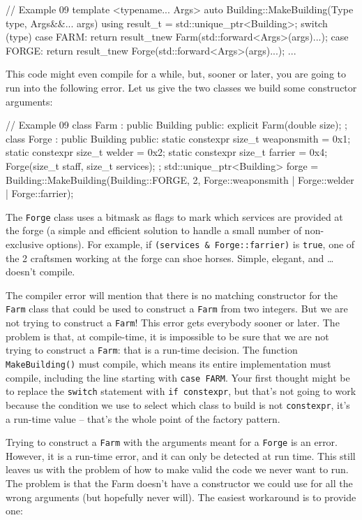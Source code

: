 \begin{code}
// Example 09
template <typename... Args>
auto Building::MakeBuilding(Type type, Args&&... args) {
  using result_t = std::unique_ptr<Building>;
  switch (type) {
    case FARM: return
      result_t{new Farm(std::forward<Args>(args)...)};
    case FORGE: return
      result_t{new Forge(std::forward<Args>(args)...)};
    ...
  }
}
\end{code}

This code might even compile for a while, but, sooner or later, you are going to run into the following error. Let us give the two classes we build some constructor arguments:

\begin{code}
// Example 09
class Farm : public Building {
  public:
  explicit Farm(double size);
};
class Forge : public Building {
  public:
  static constexpr size_t weaponsmith = 0x1;
  static constexpr size_t welder = 0x2;
  static constexpr size_t farrier = 0x4;
  Forge(size_t staff, size_t services);
};
std::unique_ptr<Building> forge =
  Building::MakeBuilding(Building::FORGE, 2,
    Forge::weaponsmith | Forge::welder | Forge::farrier);
\end{code}

The \texttt{Forge} class uses a bitmask as flags to mark which services are provided at the forge (a simple and efficient solution to handle a small number of non-exclusive options). For example, if \texttt{(services\ \&\ Forge::farrier)} is \texttt{true}, one of the 2 craftsmen working at the forge can shoe horses. Simple, elegant, and \ldots{} doesn't compile.

The compiler error will mention that there is no matching constructor for the \texttt{Farm} class that could be used to construct a \texttt{Farm} from two integers. But we are not trying to construct a \texttt{Farm}! This error gets everybody sooner or later. The problem is that, at compile-time, it is impossible to be sure that we are not trying to construct a \texttt{Farm}: that is a run-time decision. The function \texttt{MakeBuilding()} must compile, which means its entire implementation must compile, including the line starting with \texttt{case\ FARM}. Your first thought might be to replace the \texttt{switch} statement with \texttt{if\ constexpr}, but that's not going to work because the condition we use to select which class to build is not \texttt{constexpr}, it's a run-time value -- that's the whole point of the factory pattern.

Trying to construct a \texttt{Farm} with the arguments meant for a \texttt{Forge} is an error. However, it is a run-time error, and it can only be detected at run time. This still leaves us with the problem of how to make valid the code we never want to run. The problem is that the Farm doesn't have a constructor we could use for all the wrong arguments (but hopefully never will). The easiest workaround is to provide one:

